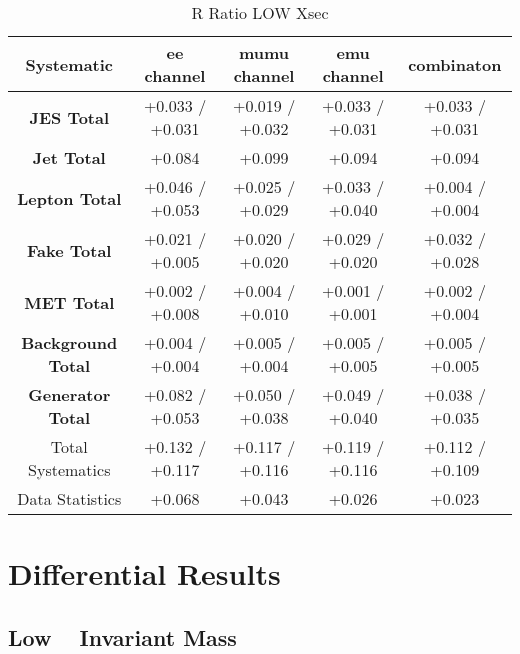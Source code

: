 \begin{table}[htbp]
\scriptsize
  \begin{center} 
  \begin{tabular}{|c|c|c|c|c|}
  \hline
       Systematic                            &  ee channel&  mumu channel&  emu channel&  combinaton\\
 \hline
\textbf{JES Total}                    &+0.033   / +0.031   & +0.019   / +0.032   & +0.033   / +0.031   & +0.033   / +0.031  \\
\textbf{Jet Total}                    &+0.084              & +0.099              & +0.094              & +0.094             \\
\textbf{Lepton Total}                 &+0.046   / +0.053   & +0.025   / +0.029   & +0.033   / +0.040   & +0.004   / +0.004  \\
\textbf{Fake Total}                   &+0.021   / +0.005   & +0.020   / +0.020   & +0.029   / +0.020   & +0.032   / +0.028  \\
\textbf{MET Total}                    &+0.002   / +0.008   & +0.004   / +0.010   & +0.001   / +0.001   & +0.002   / +0.004  \\
\textbf{Background Total}             &+0.004   / +0.004   & +0.005   / +0.004   & +0.005   / +0.005   & +0.005   / +0.005  \\
\textbf{Generator Total}              &+0.082   / +0.053   & +0.050   / +0.038   & +0.049   / +0.040   & +0.038   / +0.035  \\
  \hline
  \hline
Total Systematics                     &+0.132   / +0.117   & +0.117   / +0.116   & +0.119   / +0.116   & +0.112   / +0.109  \\
Data Statistics                       &+0.068              & +0.043              & +0.026              & +0.023             \\
  \hline
  \end{tabular}
  \end{center} 
  \label{tab:xsec_nominal_rratio_low}
  \caption{R Ratio LOW Xsec}
\end{table}

\clearpage


\section{Differential Results}
\subsection{Low \ttbar~ Invariant Mass}
